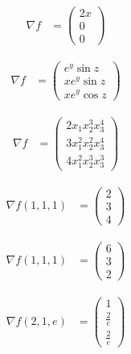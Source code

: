 \documentclass[10pt]{extarticle}
\begin{document}
  \begin{problem}{14.3}
    \begin{description}[font=\normalfont]
      \item[2:]
        \begin{align*}
          \nabla f &= \begin{pmatrix}2x\\0\\0\end{pmatrix}
        \end{align*}
      \item[8:]
        \begin{align*}
          \nabla f &= \begin{pmatrix}e^y\sin z \\ xe^y\sin z \\ xe^y \cos z\end{pmatrix}
        \end{align*}
      \item[10:]
        \begin{align*}
          \nabla f &= \begin{pmatrix}2x_1x_2^3x_3^4 \\ 3x_1^2x_2^2x_3^4 \\ 4x_1^2x_2^3x_3^3\end{pmatrix}
        \end{align*}
      \item[14:]
        \begin{align*}
          \nabla f (1,1,1) &= \begin{pmatrix}2\\3\\4\end{pmatrix}
        \end{align*}
      \item[16:]
        \begin{align*}
          \nabla f (1,1,1) &= \begin{pmatrix}6\\3\\2\end{pmatrix}
        \end{align*}
      \item[18:]
        \begin{align*}
          \nabla f(2,1,e) &= \begin{pmatrix}1\\ \frac{2}{e} \\ \frac{2}{e}\end{pmatrix}

\end{align*}
\end{description}
\end{problem}
\end{document}
